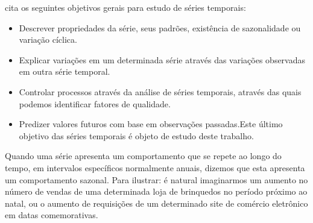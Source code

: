 \documentclass[twoside,english,brazilian]{UNISINOSmonografia}
\begin{document}
\cite{Ehlers2009} cita os seguintes objetivos gerais para estudo de séries temporais:

\begin{itemize}
	\item Descrever propriedades da série, seus padrões, existência de sazonalidade ou variação cíclica.
	\item Explicar variações em um determinada série através das variações observadas em outra série temporal.
	\item Controlar processos através da análise de séries temporais, através das quais podemos identificar fatores de qualidade.
	\item Predizer valores futuros com base em observações passadas.Este último objetivo das séries temporais é objeto de estudo deste trabalho.
\end{itemize}

Quando uma série apresenta um comportamento que se repete ao longo do tempo, em intervalos específicos normalmente anuais, dizemos que esta apresenta um comportamento sazonal. Para ilustrar: é natural imaginarmos um aumento no número de vendas de uma determinada loja de brinquedos no período próximo ao natal, ou o aumento de requisições de um determinado site de comércio eletrônico em datas comemorativas. 
\end{document}
